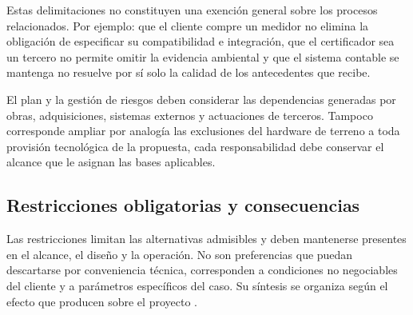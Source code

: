 Estas delimitaciones no constituyen una exención general sobre los procesos relacionados. Por ejemplo: que el cliente compre un medidor no elimina la obligación de especificar su compatibilidad e integración, que el certificador sea un tercero no permite omitir la evidencia ambiental y que el sistema contable se mantenga no resuelve por sí solo la calidad de los antecedentes que recibe.

El plan y la gestión de riesgos deben considerar las dependencias generadas por obras, adquisiciones, sistemas externos y actuaciones de terceros. Tampoco corresponde ampliar por analogía las exclusiones del hardware de terreno a toda provisión tecnológica de la propuesta, cada responsabilidad debe conservar el alcance que le asignan las bases aplicables.

\subsection{Restricciones obligatorias y consecuencias} %

Las restricciones limitan las alternativas admisibles y deben mantenerse presentes en el alcance, el diseño y la operación. No son preferencias que puedan descartarse por conveniencia técnica, corresponden a condiciones no negociables del cliente y a parámetros específicos del caso. Su síntesis se organiza según el efecto que producen sobre el proyecto \parencite[cap.~10, p.~26; cap.~15, pp.~33-36]{pucv-caso07-2026}.

